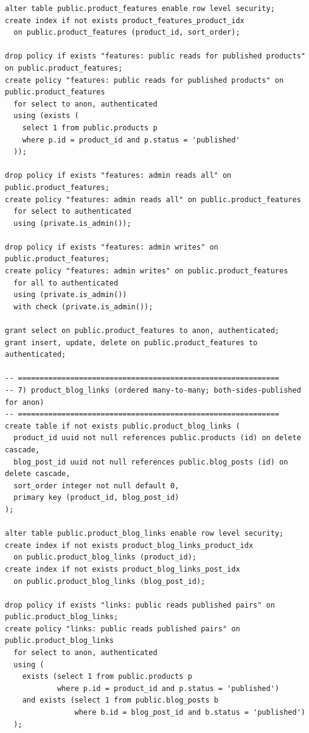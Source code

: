 \documentclass[11pt,a4paper]{article}
\begin{document}
\begin{lstlisting}
alter table public.product_features enable row level security;
create index if not exists product_features_product_idx
  on public.product_features (product_id, sort_order);

drop policy if exists "features: public reads for published products" on public.product_features;
create policy "features: public reads for published products" on public.product_features
  for select to anon, authenticated
  using (exists (
    select 1 from public.products p
    where p.id = product_id and p.status = 'published'
  ));

drop policy if exists "features: admin reads all" on public.product_features;
create policy "features: admin reads all" on public.product_features
  for select to authenticated
  using (private.is_admin());

drop policy if exists "features: admin writes" on public.product_features;
create policy "features: admin writes" on public.product_features
  for all to authenticated
  using (private.is_admin())
  with check (private.is_admin());

grant select on public.product_features to anon, authenticated;
grant insert, update, delete on public.product_features to authenticated;

-- ============================================================
-- 7) product_blog_links (ordered many-to-many; both-sides-published for anon)
-- ============================================================
create table if not exists public.product_blog_links (
  product_id uuid not null references public.products (id) on delete cascade,
  blog_post_id uuid not null references public.blog_posts (id) on delete cascade,
  sort_order integer not null default 0,
  primary key (product_id, blog_post_id)
);

alter table public.product_blog_links enable row level security;
create index if not exists product_blog_links_product_idx
  on public.product_blog_links (product_id);
create index if not exists product_blog_links_post_idx
  on public.product_blog_links (blog_post_id);

drop policy if exists "links: public reads published pairs" on public.product_blog_links;
create policy "links: public reads published pairs" on public.product_blog_links
  for select to anon, authenticated
  using (
    exists (select 1 from public.products p
            where p.id = product_id and p.status = 'published')
    and exists (select 1 from public.blog_posts b
                where b.id = blog_post_id and b.status = 'published')
  );


\end{lstlisting}
\end{document}
